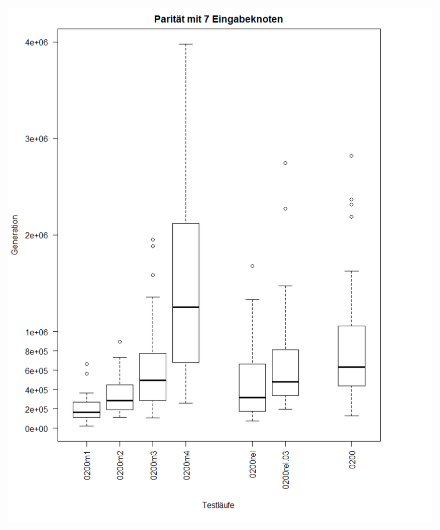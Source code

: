 \begin{figure}[h !]
\hspace*{-2.0cm}	\includegraphics[scale=0.5]{parity7plotzoomed}
\caption[Testläufe Parität 7, 200 Knoten]{}
\end{figure}


